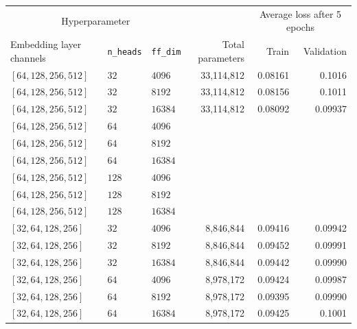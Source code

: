 \begin{table}[H]
  \centering
  \begin{adjustbox}{width=\textwidth}
    \begin{tabular}{lll|rrr}

      \multicolumn{3}{c}{Hyperparameter} && \multicolumn{2}{c}{Average loss
      after 5 epochs} \\

      Embedding layer channels & \texttt{n\_heads} & \texttt{ff\_dim} & Total
      parameters & Train & Validation\\

      \hline

      $[64, 128, 256, 512 ]$& $32$ & $4096$ & 33,114,812 & 0.08161 & 0.1016   \\
      $[64, 128, 256, 512 ]$& $32$ & $8192$ & 33,114,812 & 0.08156 & 0.1011 \\
      $[64, 128, 256, 512 ]$& $32$ & $16384$ & 33,114,812 & 0.08092 & 0.09937 \\[0.1cm]

      $[64, 128, 256, 512 ]$& $64$ & $4096$ & && \\
      $[64, 128, 256, 512 ]$& $64$ & $8192$ & && \\
      $[64, 128, 256, 512 ]$& $64$ & $16384$ & && \\[0.1cm]

      $[64, 128, 256, 512 ]$& $128$ & $4096$ & && \\
      $[64, 128, 256, 512 ]$& $128$ & $8192$ & && \\
      $[64, 128, 256, 512 ]$& $128$ & $16384$ & && \\[0.5cm]



      $[32, 64, 128, 256 ]$& $32$ & $4096$ & 8,846,844 & 0.09416 & 0.09942 \\
      $[32, 64, 128, 256 ]$& $32$ & $8192$ & 8,846,844 & 0.09452 & 0.09991 \\
      $[32, 64, 128, 256 ]$& $32$ & $16384$ & 8,846,844 & 0.09442 & 0.09990 \\[0.1cm]

      $[32, 64, 128, 256 ]$& $64$ & $4096$ & 8,978,172 & 0.09424 & 0.09987 \\
      $[32, 64, 128, 256 ]$& $64$ & $8192$ & 8,978,172 & 0.09395 & 0.09990 \\
      $[32, 64, 128, 256 ]$& $64$ & $16384$ & 8,978,172 & 0.09425 & 0.1001 \\[0.1cm]


\end{tabular}
\end{adjustbox}
\end{table}
